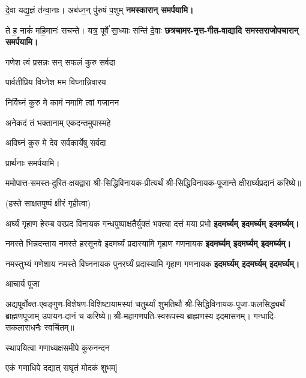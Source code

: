 \begin{center}
{दे॒वा यद्य॒ज्ञं त॑न्वा॒नाः। अब॑ध्न॒न् पु॑रुषं प॒शुम्}
\textbf{\devAya{} नमस्कारान् समर्पयामि।}
\medskip

{ते ह॒ नाकं॑ महि॒मानः॑ सचन्ते। यत्र॒ पूर्वे॑ सा॒ध्याः सन्ति॑ दे॒वाः}
\textbf{\devAya{} छत्रचामर-नृत्त-गीत-वाद्यादि समस्तराजोपचारान् समर्पयामि।}
\medskip

{गणेश त्वं प्रसन्नः सन् सफलं कुरु सर्वदा}

{पार्वतीप्रिय विघ्नेश मम विघ्नान्निवारय} 

{निर्विघ्नं कुरु मे कामं नमामि त्वां गजानन}

{अनेकदं तं भक्तानाम् एकदन्तमुपास्महे}

{अविघ्नं कुरु मे देव सर्वकार्येषु सर्वदा}

प्रार्थनाः समर्पयामि।

\resetShloka
ममोपात्त-समस्त-दुरित-क्षयद्वारा श्री-सिद्धिविनायक-प्रीत्यर्थं श्री-सिद्धिविनायक-पूजान्ते क्षीरार्घ्यप्रदानं करिष्ये॥

(हस्ते साक्षतपुष्पं क्षीरं गृहीत्वा)

\twolineshloka
{अर्घ्यं गृहाण हेरम्ब वरप्रद विनायक}
{गन्धपुष्पाक्षतैर्युक्तं भक्त्या दत्तं मया प्रभो}
\textbf{\devAya{} इदमर्घ्यम् इदमर्घ्यम् इदमर्घ्यम्।}

\twolineshloka
{नमस्ते भिन्नदन्ताय नमस्ते हरसूनवे}
{इदमर्घ्यं प्रदास्यामि गृहाण गणनायक}
\textbf{\devAya{} इदमर्घ्यम् इदमर्घ्यम् इदमर्घ्यम्।}

\twolineshloka
{नमस्तुभ्यं गणेशाय नमस्ते विघ्ननायक}
{पुनरर्घ्यं प्रदास्यामि गृहाण गणनायक}
\textbf{\devAya{} इदमर्घ्यम् इदमर्घ्यम् इदमर्घ्यम्।}

\centerline{आचार्य पूजा}

अद्यपूर्वोक्त-एवङ्गुण-विशेषण-विशिष्टायामस्यां चतुर्थ्यां शुभतिथौ श्री-सिद्धिविनायक-पूजा-फलसिद्ध्यर्थं ब्राह्मणपूजाम् उपायन-दानं च करिष्ये॥ 
श्री-महागणपति-स्वरूपस्य ब्राह्मणस्य इदमासनम्। गन्धादि-सकलाराधनैः स्वर्चितम्॥

\twolineshloka*
{[अथैकविंशतिं गृह्य मोदकान् घृतपाचितान्}
{स्थापयित्वा गणाध्यक्षसमीपे कुरुनन्दन}

{एकं गणाधिपे दद्यात् सघृतं मोदकं शुभम्]}


\end{center}

